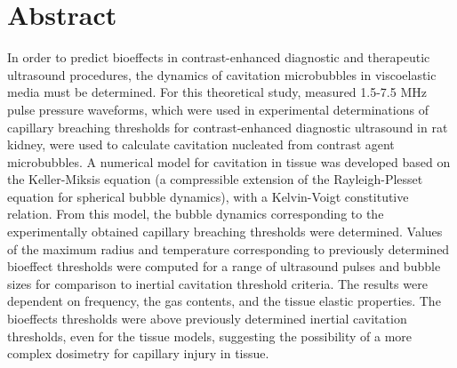 \section{Abstract}
  In order to predict bioeffects in contrast-enhanced diagnostic and
  therapeutic ultrasound procedures, the dynamics of cavitation
  microbubbles in viscoelastic media must be determined.  For this
  theoretical study, measured 1.5-7.5 MHz pulse pressure waveforms,
  which were used in experimental determinations of capillary
  breaching thresholds for contrast-enhanced diagnostic ultrasound in
  rat kidney, were used to calculate cavitation nucleated from
  contrast agent microbubbles.  A numerical model for cavitation in
  tissue was developed based on the Keller-Miksis equation (a
  compressible extension of the Rayleigh-Plesset equation for
  spherical bubble dynamics), with a Kelvin-Voigt constitutive relation. From
  this model, the bubble dynamics corresponding to the experimentally
  obtained capillary breaching thresholds were determined. Values of
  the maximum radius and temperature corresponding to previously
  determined bioeffect thresholds were computed for a range of
  ultrasound pulses and bubble sizes for comparison to inertial
  cavitation threshold criteria.  The results were dependent on
  frequency, the gas contents, and the tissue elastic properties.  The
  bioeffects thresholds were above previously determined inertial
  cavitation thresholds, even for the tissue models, suggesting the
  possibility of a more complex dosimetry for capillary injury in
  tissue.


